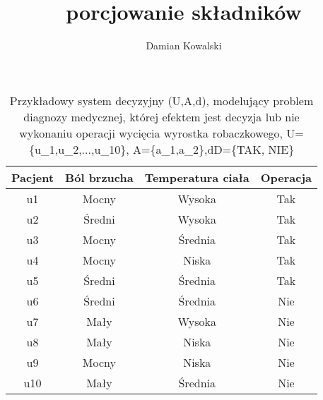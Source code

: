 \documentclass[12pt, letterpaper, titlepage]{article}
\title{porcjowanie składników}
\author{Damian Kowalski}
\begin{document}
\maketitle

\newpage

\begin{table}[h]
\centering\caption{Przykładowy system decyzyjny (U,A,d), modelujący problem diagnozy medycznej, której efektem jest decyzja lub nie wykonaniu operacji wycięcia wyrostka robaczkowego,
U=\{u_{1},u_{2},...,u_{10}\}, A=\{a_{1},a_{2}\},d\in D=\{TAK, NIE\}}

\begin {tabular}{c|ccc}
	\hline
	\hline
	Pacjent & Ból brzucha & Temperatura ciała & Operacja\\
	\hline
	u1 & Mocny & Wysoka & Tak\\
	u2 & Średni & Wysoka & Tak\\
	u3 & Mocny & Średnia & Tak\\
	u4 & Mocny & Niska & Tak\\
	u5 & Średni & Średnia & Tak\\
	u6 & Średni & Średnia & Nie\\
	u7 & Mały & Wysoka & Nie\\
	u8 & Mały & Niska & Nie\\
	u9 & Mocny & Niska & Nie\\
	u10 & Mały & Średnia & Nie\\
	\hline
	\hline
\end{tabular}
\end{table}
\end{document}
